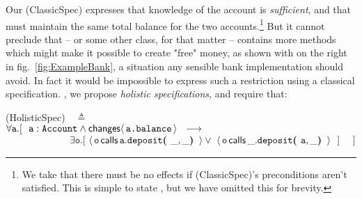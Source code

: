 Our (ClassicSpec) expresses that knowledge of the  account  is \emph{sufficient}, %
and that  %
%
  must maintain the same total balance for the two accounts.\footnote{We take that there must be no effects if (ClassicSpec)'s preconditions aren't satisfied. This is simple to state 
,
 but we have omitted this for brevity.}
%
But it cannot preclude that  -- or some other class, for that matter -- contains more methods 
which might make it possible to create "free" money, as shown with  on the right in fig.~\ref{fig:ExampleBank}, a situation any sensible bank implementation should avoid. In fact it would be impossible to express such a restriction using a classical specification. 
, we propose \emph{holistic specifications}, and require that:
 
  \vspace{.01in}
(HolisticSpec)\ \  $\triangleq$\\ 
$\forall \prg{a}.[\ \ \prg{a}:\prg{Account} \wedge \Changes{\prg{a.balance}}  \ \    
    \longrightarrow \ \    \hfill$ \\
  $\strut \hspace{2.3cm} 
  \exists \prg{o}. [\    \Calls{\prg{o}}{\prg{deposit}}{\prg{a}}{\_,\_} \vee\  \Calls{\prg{o}}{\prg{deposit}}{\_}{\prg{a},\_}\  \ ] \ \ \ \ ] \hfill $
\vspace{.05in}



